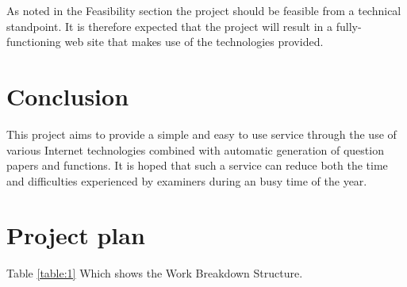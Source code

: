 As noted in the Feasibility section the project should be feasible from a technical standpoint.  It is therefore expected that the project will result in a fully-functioning web site that makes use of the technologies provided.

\section{Conclusion}

This project aims to provide a simple and easy to use service through the use of various Internet technologies combined with automatic generation of question papers and functions. It is hoped that such a service can reduce both the time and difficulties experienced by examiners during an busy time of the year.

\section{Project plan}

Table \ref{table:1} Which shows the Work Breakdown Structure.
 
